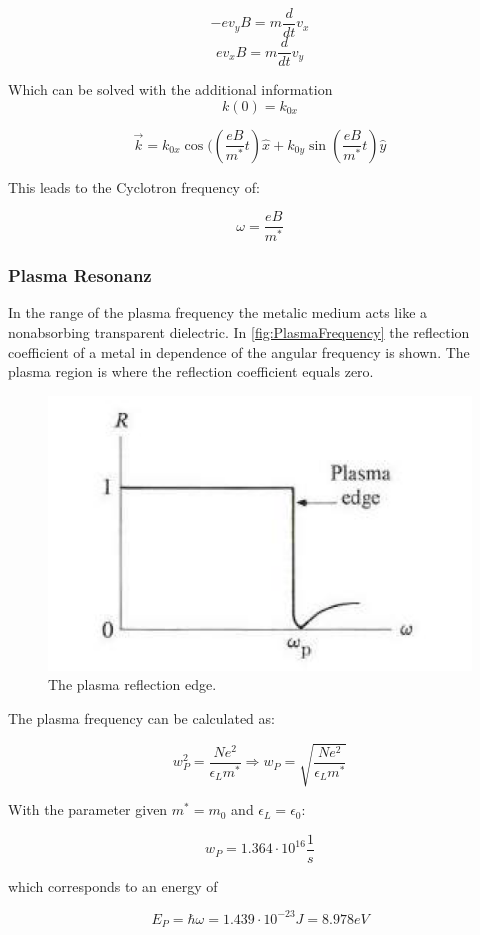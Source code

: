 $$-e v_y B = m \frac{d}{dt}v_x$$
$$e v_x B = m \frac{d}{dt}v_y$$

Which can be solved with the additional information $$k(0) = k_{0x}$$

$$\vec{k} = k_{0x} \cos(\left(\frac{eB}{m^*}t\right) \hat{x} +  k_{0y} \sin \left(\frac{eB}{m^*}t\right) \hat{y}$$

This leads to the Cyclotron frequency of:

$$\omega = \frac{eB}{m^*}$$

\subsubsection*{Plasma Resonanz}

In the range of the plasma frequency the metalic medium acts
like a nonabsorbing transparent dielectric.
In \autoref{fig:PlasmaFrequency} the reflection coefficient
of a metal in dependence of the angular frequency is shown. 
The plasma region is where the reflection coefficient equals 
zero.

\begin{figure}[H]
    \centering
    \includegraphics[width=0.6\linewidth]{Graphics/Chapter1/PlasmaFrequency.png}
    \caption{The plasma reflection edge.
    \cite[Elementary Solid State Physics p. 166]{elementary_SSP} }
    \label{fig:PlasmaFrequency}
\end{figure}

The plasma frequency can be calculated as:

\begin{equation}
    w_P^2 = \frac{Ne^2}{\epsilon_L m^*} \Rightarrow w_P = \sqrt{\frac{Ne^2}{\epsilon_L m^*}}
\end{equation}

With the parameter given $m^*=m_0$ and $\epsilon_L = \epsilon_0$:

$$w_P = 1.364 \cdot 10^{16} \frac{1}{s}$$

which corresponds to an energy of 

$$E_P = \hbar \omega = 1.439\cdot 10^{-23}J = 8.978eV$$